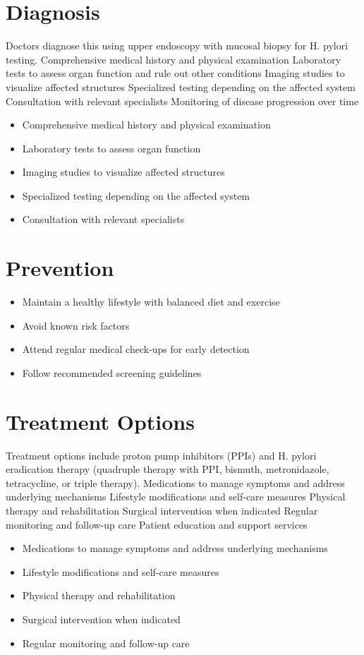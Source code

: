 \section{Diagnosis}
Doctors diagnose this using upper endoscopy with mucosal biopsy for H. pylori testing. Comprehensive medical history and physical examination Laboratory tests to assess organ function and rule out other conditions Imaging studies to visualize affected structures Specialized testing depending on the affected system Consultation with relevant specialists Monitoring of disease progression over time

\begin{itemize}[noitemsep]
  \item Comprehensive medical history and physical examination
  \item Laboratory tests to assess organ function
  \item Imaging studies to visualize affected structures
  \item Specialized testing depending on the affected system
  \item Consultation with relevant specialists
\end{itemize}
\section{Prevention}
\begin{itemize}[noitemsep]
  \item Maintain a healthy lifestyle with balanced diet and exercise
  \item Avoid known risk factors
  \item Attend regular medical check-ups for early detection
  \item Follow recommended screening guidelines
\end{itemize}
\section{Treatment Options}
Treatment options include proton pump inhibitors (PPIs) and H. pylori eradication therapy (quadruple therapy with PPI, bismuth, metronidazole, tetracycline, or triple therapy). Medications to manage symptoms and address underlying mechanisms Lifestyle modifications and self-care measures Physical therapy and rehabilitation Surgical intervention when indicated Regular monitoring and follow-up care Patient education and support services

\begin{itemize}[noitemsep]
  \item Medications to manage symptoms and address underlying mechanisms
  \item Lifestyle modifications and self-care measures
  \item Physical therapy and rehabilitation
  \item Surgical intervention when indicated
  \item Regular monitoring and follow-up care
\end{itemize}
